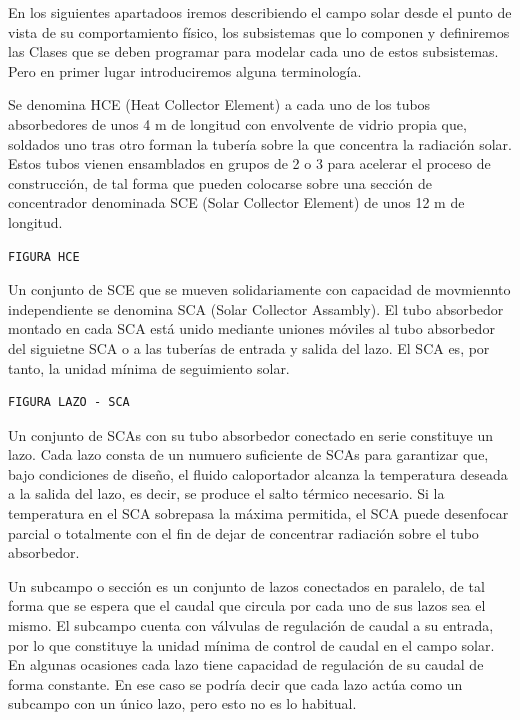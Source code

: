 \documentclass[11pt]{article}
\begin{document}
En los siguientes apartadoos iremos describiendo el campo solar desde el
punto de vista de su comportamiento físico, los subsistemas que lo
componen y definiremos las Clases que se deben programar para modelar
cada uno de estos subsistemas. Pero en primer lugar introduciremos
alguna terminología.

Se denomina HCE (Heat Collector Element) a cada uno de los tubos
absorbedores de unos 4 m de longitud con envolvente de vidrio propia
que, soldados uno tras otro forman la tubería sobre la que concentra la
radiación solar. Estos tubos vienen ensamblados en grupos de 2 o 3 para
acelerar el proceso de construcción, de tal forma que pueden colocarse
sobre una sección de concentrador denominada SCE (Solar Collector
Element) de unos 12 m de longitud.

\begin{verbatim}
FIGURA HCE
\end{verbatim}

Un conjunto de SCE que se mueven solidariamente con capacidad de
movmiennto independiente se denomina SCA (Solar Collector Assambly). El
tubo absorbedor montado en cada SCA está unido mediante uniones móviles
al tubo absorbedor del siguietne SCA o a las tuberías de entrada y
salida del lazo. El SCA es, por tanto, la unidad mínima de seguimiento
solar.

\begin{verbatim}
FIGURA LAZO - SCA
\end{verbatim}

Un conjunto de SCAs con su tubo absorbedor conectado en serie constituye
un lazo. Cada lazo consta de un numuero suficiente de SCAs para
garantizar que, bajo condiciones de diseño, el fluido caloportador
alcanza la temperatura deseada a la salida del lazo, es decir, se
produce el salto térmico necesario. Si la temperatura en el SCA
sobrepasa la máxima permitida, el SCA puede desenfocar parcial o
totalmente con el fin de dejar de concentrar radiación sobre el tubo
absorbedor.

Un subcampo o sección es un conjunto de lazos conectados en paralelo, de
tal forma que se espera que el caudal que circula por cada uno de sus
lazos sea el mismo. El subcampo cuenta con válvulas de regulación de
caudal a su entrada, por lo que constituye la unidad mínima de control
de caudal en el campo solar. En algunas ocasiones cada lazo tiene
capacidad de regulación de su caudal de forma constante. En ese caso se
podría decir que cada lazo actúa como un subcampo con un único lazo,
pero esto no es lo habitual.
\end{document}
